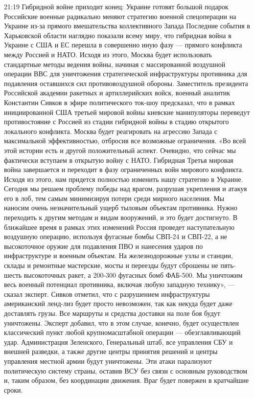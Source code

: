 21:19
Гибридной войне приходит конец: Украине готовят большой подарок
Российские военные радикально меняют стратегию военной спецоперации на Украине из-за прямого вмешательства коллективного Запада
Последние события в Харьковской области наглядно показали всему миру, что гибридная война в Украине с США и ЕС перешла в совершенно иную фазу — прямого конфликта между Россией и НАТО. Исходя из этого, Москва будет использовать стандартные методы ведения войны, начиная с массированной воздушной операции ВВС для уничтожения стратегической инфраструктуры противника для подавления оставшихся сил противовоздушной обороны.
Заместитель президента Российской академии ракетных и артиллерийских войск, военный аналитик Константин Сивков в эфире политического ток-шоу предсказал, что в рамках инициированной США третьей мировой войны киевские манипуляторы переведут противостояние с Россией из стадии гибридной войны в стадию открытого локального конфликта. Москва будет реагировать на агрессию Запада с максимальной эффективностью, отбросив все возможные ограничения.
«Во всей этой истории есть и другой положительный аспект. Очевидно, что сейчас мы фактически вступаем в открытую войну с НАТО. Гибридная Третья мировая война завершается и переходит в фазу ограниченных войн мирового конфликта. Исходя из этого, нам придется полностью изменить нашу стратегию в Украине. Сегодня мы решаем проблему победы над врагом, разрушая укрепления и атакуя его в лоб, тем самым минимизируя потери среди мирного населения. Мы наносим очень незначительный ущерб тыловым объектам противника. Нужно переходить к другим методам и видам вооружений, и это будет достигнуто. В ближайшее время в рамках этих изменений Россия проведет наступательную воздушную операцию, используя фугасные бомбы СВП-24 и СВП-22, а не высокоточное оружие для подавления ПВО и нанесения ударов по инфраструктуре и военным объектам. На железнодорожные узлы и станции, склады и ремонтные мастерские, мосты и переезды будут сброшены не пять-шесть высокоточных ракет, а 200-300 фугасных бомб ФАБ-500. Мы уничтожим весь военный потенциал противника, включая любую западную технику», — сказал эксперт.
Сивков отметил, что с разрушением инфраструктуры американский ленд-лиз будет просто невозможен, так как некуда будет даже доставлять грузы. Все маршруты и средства доставки на поле боя будут уничтожены.
Эксперт добавил, что в этом случае, конечно, будет осуществлен классический пункт любой крупномасштабной операции — обезглавливающий удар. Администрация Зеленского, Генеральный штаб, все управления СБУ и внешней разведки, а также другие центры принятия решений и центры управления местной армии будут уничтожены. Эти атаки парализуют политическую систему страны, оставив ВСУ без связи с основным руководством и, таким образом, без координации движения. Враг будет повержен в кратчайшие сроки.


